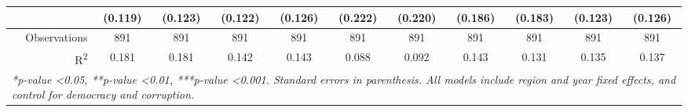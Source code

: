 \documentclass{article}
\begin{document}
\begin{singlespace}
\begin{landscape}
\begin{table}[H]
{\begin{tabular}{rcccccccccc}
					\textit{} & (0.119) & (0.123) & (0.122) & (0.126) & (0.222) & (0.220) & (0.186) & (0.183) & (0.123) & (0.126) \\ \hline
					Observations & 891 & 891 & 891 & 891 & 891 & 891 & 891 & 891 & 891 & 891 \\
					R\textsuperscript{2} & 0.181 & 0.181 & 0.142 & 0.143 & 0.088 & 0.092 & 0.143 & 0.131 & 0.135 & 0.137 \\ \hline
					\multicolumn{11}{l}{\textit{*p-value \textless 0.05, **p-value \textless 0.01, ***p-value \textless 0.001.  Standard errors in parenthesis. All models include region and year fixed effects, and control for democracy and corruption.}}
				\end{tabular}%
			}
		\end{table}
	\end{landscape}
\end{singlespace}		
\end{document}
